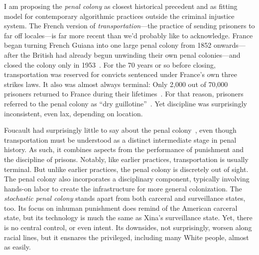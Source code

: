 I am proposing the \emph{penal colony} as closest historical precedent and as
fitting model for contemporary algorithmic practices outside the criminal
injustice system. The French version of \emph{transportation}---the practice
of sending prisoners to far off locales---is far more recent than we'd
probably like to acknowledge. France began turning French Guiana into one large
penal colony from 1852 onwards---after the British had already begun unwinding
their own penal colonies---and closed the colony only in
1953~\cite{Aldrich2010,Anderson2018,Spierenburg2009}. For the 70 years or so
before closing, transportation was reserved for convicts sentenced under
France's own three strikes laws. It also was almost always terminal: Only 2,000
out of 70,000 prisoners returned to France during their
lifetimes~\cite{WallechinskyWallace1978}. For that reason, prisoners referred to
the penal colony as ``dry guillotine''~\cite{Furlong1913,ReneBelbenoit1938}. Yet
discipline was surprisingly inconsistent, even lax, depending on location.

Foucault had surprisingly little to say about the penal
colony~\cite{Redfield2005}, even though transportation must be understood as a
distinct intermediate stage in penal history. As such, it combines aspects from
the performance of punishment and the discipline of prisons. Notably, like
earlier practices, transportation is usually terminal. But unlike earlier
practices, the penal colony is discretely out of sight. The penal colony also
incorporates a disciplinary component, typically involving hands-on labor to
create the infrastructure for more general colonization. The \emph{stochastic
penal colony} stands apart from both carceral and surveillance states, too. Its
focus on inhuman punishment does remind of the American carceral state, but its
technology is much the same as Xina's surveillance state. Yet, there is no
central control, or even intent. Its downsides, not surprisingly, worsen along
racial lines, but it ensnares the privileged, including many White people,
almost as easily.

